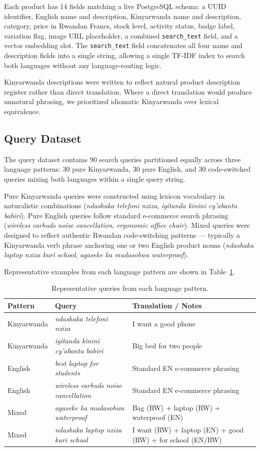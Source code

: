 \documentclass[11pt,a4paper]{article}
\begin{document}
Each product has 14 fields matching a live PostgreSQL schema: a UUID
identifier, English name and description, Kinyarwanda name and description,
category, price in Rwandan Francs, stock level, activity status, badge
label, variation flag, image URL placeholder, a combined \texttt{search\_text}
field, and a vector embedding slot. The \texttt{search\_text} field
concatenates all four name and description fields into a single string,
allowing a single TF-IDF index to search both languages without any
language-routing logic.

Kinyarwanda descriptions were written to reflect natural product description
register rather than direct translation. Where a direct translation would
produce unnatural phrasing, we prioritized idiomatic Kinyarwanda over
lexical equivalence.

\subsection{Query Dataset}

The query dataset contains 90 search queries partitioned equally across
three language patterns: 30 pure Kinyarwanda, 30 pure English, and 30
code-switched queries mixing both languages within a single query string.

Pure Kinyarwanda queries were constructed using lexicon vocabulary in
naturalistic combinations (\textit{ndashaka telefoni nziza},
\textit{igitanda kinini cy'abantu babiri}). Pure English queries follow
standard e-commerce search phrasing (\textit{wireless earbuds noise
cancellation}, \textit{ergonomic office chair}). Mixed queries were
designed to reflect authentic Rwandan code-switching patterns — typically
a Kinyarwanda verb phrase anchoring one or two English product nouns
(\textit{ndashaka laptop nziza kuri school}, \textit{agaseke ka mudasobwa
waterproof}).

Representative examples from each language pattern are shown in
Table~\ref{tab:queries}.

\begin{table}[H]
\centering
\caption{Representative queries from each language pattern.}
\label{tab:queries}
\begin{tabularx}{\textwidth}{llX}
\toprule
\textbf{Pattern} & \textbf{Query} & \textbf{Translation / Notes} \\
\midrule
Kinyarwanda &
  \textit{ndashaka telefoni nziza} &
  I want a good phone \\
Kinyarwanda &
  \textit{igitanda kinini cy'abantu babiri} &
  Big bed for two people \\
English &
  \textit{best laptop for students} &
  Standard EN e-commerce phrasing \\
English &
  \textit{wireless earbuds noise cancellation} &
  Standard EN e-commerce phrasing \\
Mixed &
  \textit{agaseke ka mudasobwa waterproof} &
  Bag (RW) + laptop (RW) + waterproof (EN) \\
Mixed &
  \textit{ndashaka laptop nziza kuri school} &
  I want (RW) + laptop (EN) + good (RW) + for school (EN/RW) \\
\bottomrule
\end{tabularx}
\end{table}
\end{document}

